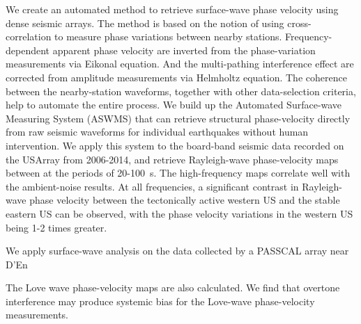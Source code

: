 We create an automated method to retrieve surface-wave phase velocity using dense seismic arrays. The method is based on the notion of using cross-correlation to measure phase variations between nearby stations. Frequency-dependent apparent phase velocity are inverted from the phase-variation measurements via Eikonal equation. And the multi-pathing interference effect are corrected from amplitude measurements via Helmholtz equation. The coherence between the nearby-station waveforms, together with other data-selection criteria, help to automate the entire process. We build up the Automated Surface-wave Measuring System (ASWMS) that can retrieve structural phase-velocity directly from raw seismic waveforms for individual earthquakes without human intervention. 
We apply this system to the board-band seismic data recorded on the USArray from 2006-2014, and retrieve Rayleigh-wave phase-velocity maps between at the periods of 20-100~s. The high-frequency maps correlate well with the ambient-noise results. At all frequencies, a significant contrast in Rayleigh-wave phase velocity between the tectonically active western US and the stable eastern US can be observed, with the phase velocity variations in the western US being 1-2 times greater.

We apply surface-wave analysis on the data collected by a PASSCAL array near D'En

The Love wave phase-velocity maps are also calculated. We find that overtone interference may produce systemic bias for the Love-wave phase-velocity measurements.

\raggedbottom
\pagebreak

\frontmatter

\pagestyle{fancy}
\chead{}
\lhead{}
\rhead{}
\cfoot{\thepage}
\renewcommand{\headrulewidth}{0pt}

\tableofcontents
{}
\raggedbottom
\pagebreak

\listoffigures
{}
\raggedbottom
\pagebreak

\listoftables
{}
\raggedbottom
\pagebreak

